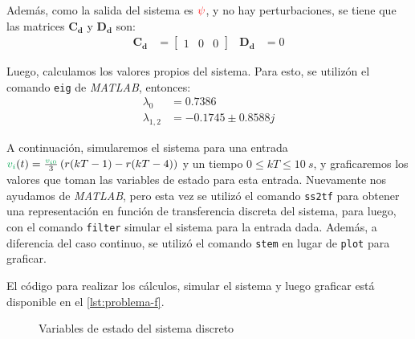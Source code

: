 Además, como la salida del sistema es $\mathbin{\color{red}\psi}$, y no hay perturbaciones,
se tiene que las matrices $\pmb{C_{d}}$ y $\pmb{D_{d}}$ son:
\begin{align}
  \pmb{C_{d}} &= \begin{bmatrix}
      1 & 0 & 0
  \end{bmatrix} &
  \pmb{D_{d}} &= 0
\end{align}

Luego, calculamos los valores propios del sistema. Para esto, se utilizón el
comando \verb|eig| de \textit{MATLAB}, entonces:
\begin{align}
  \lambda_{0} &=  0.7386 \\
  \lambda_{1,2} &=  -0.1745 \pm 0.8588j
\end{align}

A continuación, simularemos el sistema para una entrada
$\verd{v_{i}}(t) = \frac{\verd{v_{i0}}}{3}\left(r(kT-1) - r(kT-4)\right)$
y un tiempo $0 \leq kT \leq 10\ \unit{s}$, y graficaremos los valores que
toman las variables de estado para esta entrada. Nuevamente nos ayudamos
de \textit{MATLAB}, pero esta vez se utilizó el comando \verb|ss2tf| para
obtener una representación en función de transferencia discreta del sistema,
para luego, con el comando \verb|filter| simular el sistema para la entrada
dada. Además, a diferencia del caso continuo, se utilizó el comando \verb|stem|
en lugar de \verb|plot| para graficar.

El código para realizar los cálculos, simular el sistema y luego graficar está
disponible en el \autoref{lst:problema-f}.

\begin{figure}[h]
  \centering
  
  \caption{Variables de estado del sistema discreto}\label{fig:estado-discreto}
\end{figure}
